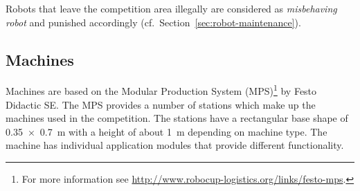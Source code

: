 \documentclass[12pt,twoside]{article}
\newcommand{\refsec}[1]{Section~\ref{#1}}
\begin{document}
Robots that leave the competition area illegally are considered as
\emph{misbehaving robot} and punished accordingly
(cf.~\refsec{sec:robot-maintenance}).

\subsection{Machines}
\label{sec:machines}
Machines are based on the Modular Production System (MPS)\footnote{For
  more information see
  \url{http://www.robocup-logistics.org/links/festo-mps}.} by Festo
Didactic SE\@. The MPS provides a number of stations which
make up the machines used in the competition. The stations have a
rectangular base shape of \SI{0,35 x 0,7}{\metre} with a height of %
about \SI{1}{\metre} depending on machine type. The machine
has individual application modules that provide different
functionality.
\end{document}
